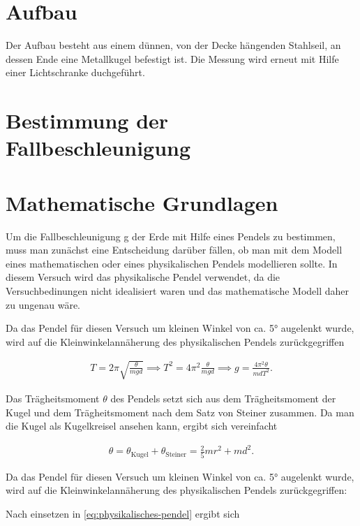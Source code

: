 \section{Aufbau}

Der Aufbau besteht aus einem dünnen, von der Decke hängenden Stahlseil, an dessen Ende eine Metallkugel befestigt ist. Die Messung wird erneut mit Hilfe einer Lichtschranke duchgeführt.

\section{Bestimmung der Fallbeschleunigung}

\section{Mathematische Grundlagen}

Um die Fallbeschleunigung g der Erde mit Hilfe eines Pendels zu bestimmen, muss man zunächst eine Entscheidung darüber fällen, ob man mit dem Modell eines mathematischen oder eines physikalischen Pendels modellieren sollte.
In diesem Versuch wird das physikalische Pendel verwendet, da die Versuchbedinungen nicht idealisiert waren und das mathematische Modell daher zu ungenau wäre.

Da das Pendel für diesen Versuch um kleinen Winkel von ca. 5° augelenkt wurde, wird auf die Kleinwinkelannäherung des physikalischen Pendels zurückgegriffen

\begin{align}
	\label{eq:physikalisches-pendel}
	T = 2 \pi \sqrt{\frac{\theta}{m g d}}  \implies T^2 = 4 \pi^2 \frac{\theta}{m g d} \implies g = \frac{4 \pi^2 \theta}{m d T^2} .
\end{align}

Das Trägheitsmoment $\theta$ des Pendels setzt sich aus dem Trägheitsmoment der Kugel und dem Trägheitsmoment nach dem Satz von Steiner zusammen.
Da man die Kugel als Kugelkreisel ansehen kann, ergibt sich vereinfacht

\begin{align}
	\theta = \theta_\text{Kugel} + \theta_\text{Steiner} = \frac{2}{5} m r^2 + m d^2 .
\end{align}

Da das Pendel für diesen Versuch um kleinen Winkel von ca. 5° augelenkt wurde, wird auf die Kleinwinkelannäherung des physikalischen Pendels zurückgegriffen:

Nach einsetzen in \ref{eq:physikalisches-pendel} ergibt sich

